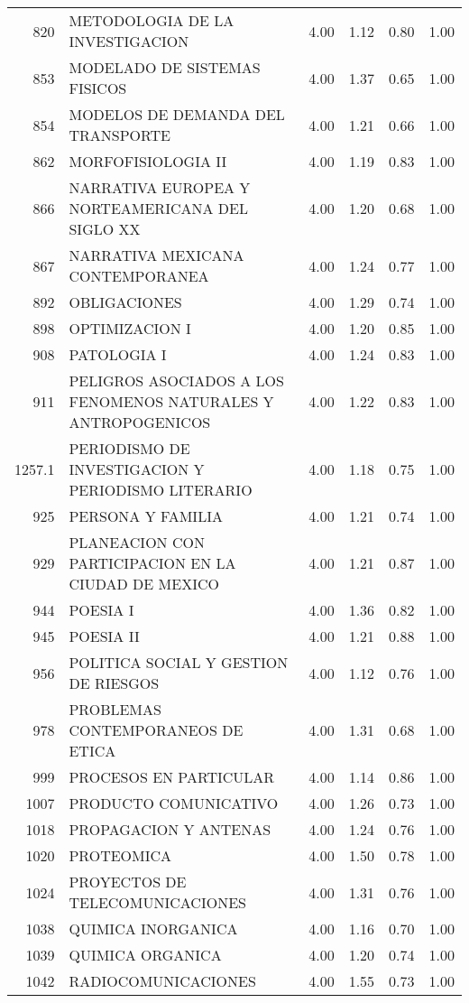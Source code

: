 \documentclass[12pt]{article}
\begin{document}
\begin{table}[ht]
\begin{tabular}{rlrrrr}
  820 & METODOLOGIA DE LA INVESTIGACION & 4.00 & 1.12 & 0.80 & 1.00 \\ 
  853 & MODELADO DE SISTEMAS FISICOS & 4.00 & 1.37 & 0.65 & 1.00 \\ 
  854 & MODELOS DE DEMANDA DEL TRANSPORTE & 4.00 & 1.21 & 0.66 & 1.00 \\ 
  862 & MORFOFISIOLOGIA II & 4.00 & 1.19 & 0.83 & 1.00 \\ 
  866 & NARRATIVA EUROPEA Y NORTEAMERICANA DEL SIGLO XX & 4.00 & 1.20 & 0.68 & 1.00 \\ 
  867 & NARRATIVA MEXICANA CONTEMPORANEA & 4.00 & 1.24 & 0.77 & 1.00 \\ 
  892 & OBLIGACIONES & 4.00 & 1.29 & 0.74 & 1.00 \\ 
  898 & OPTIMIZACION I & 4.00 & 1.20 & 0.85 & 1.00 \\ 
  908 & PATOLOGIA I & 4.00 & 1.24 & 0.83 & 1.00 \\ 
  911 & PELIGROS ASOCIADOS A LOS FENOMENOS NATURALES Y ANTROPOGENICOS & 4.00 & 1.22 & 0.83 & 1.00 \\ 
  1257.1 & PERIODISMO DE INVESTIGACION Y PERIODISMO LITERARIO & 4.00 & 1.18 & 0.75 & 1.00 \\ 
  925 & PERSONA Y FAMILIA & 4.00 & 1.21 & 0.74 & 1.00 \\ 
  929 & PLANEACION CON PARTICIPACION EN LA CIUDAD DE MEXICO & 4.00 & 1.21 & 0.87 & 1.00 \\ 
  944 & POESIA I & 4.00 & 1.36 & 0.82 & 1.00 \\ 
  945 & POESIA II & 4.00 & 1.21 & 0.88 & 1.00 \\ 
  956 & POLITICA SOCIAL Y GESTION DE RIESGOS & 4.00 & 1.12 & 0.76 & 1.00 \\ 
  978 & PROBLEMAS CONTEMPORANEOS DE ETICA & 4.00 & 1.31 & 0.68 & 1.00 \\ 
  999 & PROCESOS EN PARTICULAR & 4.00 & 1.14 & 0.86 & 1.00 \\ 
  1007 & PRODUCTO COMUNICATIVO & 4.00 & 1.26 & 0.73 & 1.00 \\ 
  1018 & PROPAGACION Y ANTENAS & 4.00 & 1.24 & 0.76 & 1.00 \\ 
  1020 & PROTEOMICA & 4.00 & 1.50 & 0.78 & 1.00 \\ 
  1024 & PROYECTOS DE TELECOMUNICACIONES & 4.00 & 1.31 & 0.76 & 1.00 \\ 
  1038 & QUIMICA INORGANICA & 4.00 & 1.16 & 0.70 & 1.00 \\ 
  1039 & QUIMICA ORGANICA & 4.00 & 1.20 & 0.74 & 1.00 \\ 
  1042 & RADIOCOMUNICACIONES & 4.00 & 1.55 & 0.73 & 1.00 \\ 

\end{tabular}
\end{table}
\end{document}
